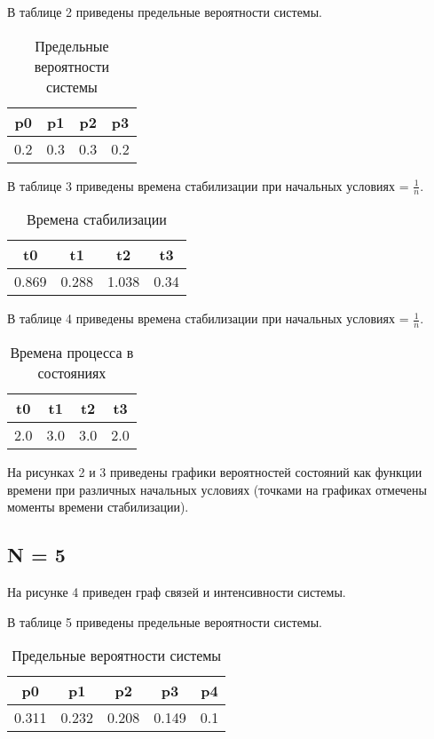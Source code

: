 В таблице 2 приведены предельные вероятности системы.
\begin{table}[h!]
	\centering
	\caption{Предельные вероятности системы}
	\begin{tabular}{|c c c c|} 
		\hline
		p0 & p1 & p2  & p3  \\ [0.5ex] 
		\hline
		0.2 & 0.3 & 0.3 & 0.2 \\ [0.5ex] 
		\hline
	\end{tabular}
\end{table}

В таблице 3 приведены времена стабилизации при начальных условиях = $\frac{1}{n}$.
\begin{table}[h!]
	\centering
	\caption{Времена стабилизации}
	\begin{tabular}{|c c c c|} 
		\hline
		t0 & t1 & t2  & t3  \\ [0.5ex] 
		\hline
		0.869 & 0.288 & 1.038 & 0.34 \\ [0.5ex] 
		\hline
	\end{tabular}
\end{table}

В таблице 4 приведены времена стабилизации при начальных условиях = $\frac{1}{n}$.
\begin{table}[h!]
	\centering
	\caption{Времена процесса в состояниях}
	\begin{tabular}{|c c c c|} 
		\hline
		t0 & t1 & t2  & t3  \\ [0.5ex] 
		\hline
		2.0 & 3.0 & 3.0 & 2.0 \\ [0.5ex] 
		\hline
	\end{tabular}
\end{table}


На рисунках 2 и 3 приведены графики вероятностей состояний как функции времени при различных начальных условиях (точками на графиках отмечены моменты времени стабилизации).




\subsection*{N = 5}
На рисунке 4 приведен граф связей и интенсивности системы.


В таблице 5 приведены предельные вероятности системы.
\begin{table}[h!]
	\centering
	\caption{Предельные вероятности системы}
	\begin{tabular}{|c c c c c|} 
		\hline
		p0 & p1 & p2  & p3 & p4  \\ [0.5ex] 
		\hline
		0.311 & 0.232 & 0.208 & 0.149 & 0.1 \\ [0.5ex] 
		\hline
	\end{tabular}
\end{table}

